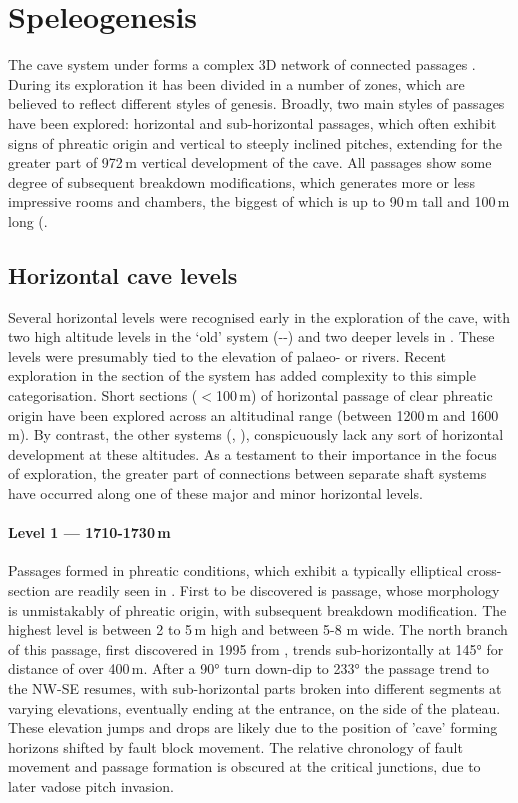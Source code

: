  \section{Speleogenesis}
The cave system under  forms a complex 3D network of connected passages .
 During its exploration it has been divided in a number of zones, which are believed to reflect different styles of genesis. Broadly, two main styles of passages have been explored: horizontal and sub-horizontal passages, which often exhibit signs of phreatic origin and vertical to steeply inclined pitches, extending for the greater part of 972\,m vertical development of the cave. 
 All passages show some degree of subsequent breakdown modifications, which generates more or less impressive rooms and chambers, the biggest of which is up to 90\,m tall and 100\,m long (.

\subsection{Horizontal cave levels}
Several horizontal levels were recognised early in the exploration of the cave, with two high altitude levels in the ‘old’ system (--) and two deeper levels in . 
These levels were presumably tied to the elevation of palaeo- or  rivers. 
Recent exploration in the  section of the system has added complexity to this simple categorisation. 
Short sections ($<$100\,m) of horizontal passage of clear phreatic origin have been explored across an altitudinal range (between 1200\,m and 1600\,m). 
By contrast, the other systems (, ), conspicuously lack any sort of horizontal development at these altitudes. 
As a testament to their importance in the focus of exploration, the greater part of connections between separate shaft systems have occurred along one of these major and minor horizontal levels.

\paragraph{Level 1 — 1710-1730\,m}
Passages formed in phreatic conditions, which exhibit a typically elliptical cross-section are readily seen in . 
First to be discovered is  passage, whose morphology is unmistakably of phreatic origin, with subsequent breakdown modification. 
The highest level is between 2 to 5\,m high and between 5-8 m wide. 
The north branch of this passage, first discovered in 1995 from , trends sub-horizontally at 145° for distance of over 400\,m. 
After a 90° turn down-dip to 233° the passage trend to the NW-SE resumes, with sub-horizontal parts broken into different segments at varying elevations, eventually ending at the  entrance, on the side of the plateau. 
These elevation jumps and drops are likely due to the position of ’cave’ forming horizons shifted by fault block movement. 
The relative chronology of fault movement and passage formation is obscured at the critical junctions, due to later vadose pitch invasion. 

